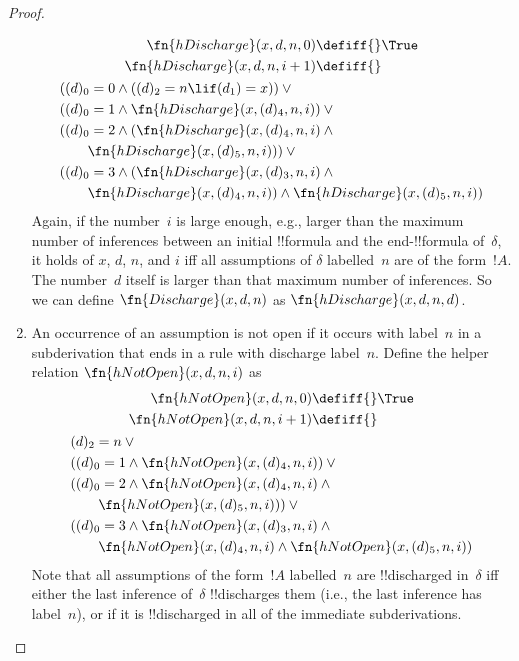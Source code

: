 \documentclass[../../../include/open-logic-section]{subfiles}
\begin{document}
\begin{proof}
\begin{enumerate}
\begin{multline*}
    \begin{aligned}
    \fn{hDischarge}(x, d, n, 0) \defiff {} & \True\\   
    \fn{hDischarge}(x, d, n, i+1) \defiff {} &
    \end{aligned}\\
    \begin{aligned}
      &  ((d)_0 = 0 \land ((d)_2 = n \lif (d_1) = x)) \lor {}\\
      & ((d)_0 = 1 \land \fn{hDischarge}(x, (d)_4, n, i)) \lor {}\\
      & ((d)_0 = 2 \land (\fn{hDischarge}(x, (d)_4, n, i) \land {}\\
      & \qquad\fn{hDischarge}(x, (d)_5, n, i))) \lor {}\\
      & ((d)_0 = 3 \land (\fn{hDischarge}(x, (d)_3, n, i) \land {}\\
      & \qquad \fn{hDischarge}(x, (d)_4, n, i)) \land
      \fn{hDischarge}(x, (d)_5, n, i))
    \end{aligned}
  \end{multline*}
   Again, if the number~$i$ is large enough, e.g., larger than the
   maximum number of inferences between an initial !!{formula} and the
   end-!!{formula} of~$\delta$, it holds of $x$, $d$, $n$, and $i$ iff
   all assumptions of $\delta$ labelled~$n$ are of the form~$!A$.  The
   number~$d$ itself is larger than that maximum number of inferences.
   So we can define $\fn{Discharge}(x, d, n)$ as $\fn{hDischarge}(x,
   d, n, d)$.
\item An occurrence of an assumption is not open if it occurs
  with label~$n$ in a subderivation that ends in a rule with discharge
  label~$n$. Define the helper relation $\fn{hNotOpen}(x, d, n, i)$
  as
  \begin{multline*}
    \begin{aligned}
    \fn{hNotOpen}(x, d, n, 0) \defiff {} & \True\\   
    \fn{hNotOpen}(x, d, n, i+1) \defiff {} 
    \end{aligned}\\
    \begin{aligned}
      & (d)_2 = n \lor {}\\
      & ((d)_0 = 1 \land \fn{hNotOpen}(x, (d)_4, n, i)) \lor {}\\
      & ((d)_0 = 2 \land \fn{hNotOpen}(x, (d)_4, n, i) \land {}\\
      & \qquad\fn{hNotOpen}(x, (d)_5, n, i))) \lor {}\\
      & ((d)_0 = 3 \land \fn{hNotOpen}(x, (d)_3, n, i) \land {}\\
      & \qquad \fn{hNotOpen}(x, (d)_4, n, i) \land
      \fn{hNotOpen}(x, (d)_5, n, i))\\
    \end{aligned}
  \end{multline*}
  Note that all assumptions of the form~$!A$ labelled~$n$ are
  !!{discharged} in~$\delta$ iff either the last inference of~$\delta$
  !!{discharge}s them (i.e., the last inference has label~$n$), or if
  it is !!{discharged} in all of the immediate subderivations.


\end{enumerate}
\end{proof}
\end{document}
